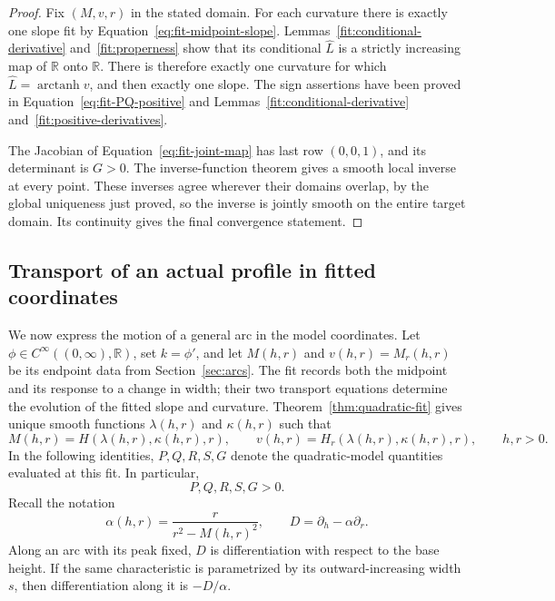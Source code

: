 \begin{proof}
Fix \((M,v,r)\) in the stated domain.  For each curvature there is
exactly one slope fit by Equation~\eqref{eq:fit-midpoint-slope}.
Lemmas~\ref{fit:conditional-derivative} and~\ref{fit:properness}
show that its conditional \(\widehat L\) is a strictly increasing
map of \(\mathbb R\) onto \(\mathbb R\).  There is therefore exactly
one curvature for which \(\widehat L=\operatorname{arctanh}v\),
and then exactly one slope.  The sign assertions have been proved
in Equation~\eqref{eq:fit-PQ-positive} and
Lemmas~\ref{fit:conditional-derivative} and~\ref{fit:positive-derivatives}.

The Jacobian of Equation~\eqref{eq:fit-joint-map} has last row
\((0,0,1)\), and its determinant is \(G>0\).  The inverse-function
theorem gives a smooth local inverse at every point.  These inverses
agree wherever their domains overlap, by the global uniqueness
just proved, so the inverse is jointly smooth on the entire target
domain.  Its continuity gives the final convergence statement.
\end{proof}

\subsection{Transport of an actual profile in fitted coordinates}

We now express the motion of a general arc in the model coordinates.
Let $\phi\in C^\infty((0,\infty),\mathbb R)$, set $k=\phi'$,
and let $M(h,r)$ and $v(h,r)=M_r(h,r)$ be its endpoint data from
Section~\ref{sec:arcs}. The fit records both the midpoint and its
response to a change in width; their two transport equations determine
the evolution of the fitted slope and curvature.
Theorem~\ref{thm:quadratic-fit} gives unique smooth functions $\lambda(h,r)$ and $\kappa(h,r)$ such that
\begin{equation}\label{eq:fit-identities}
 M(h,r)=H(\lambda(h,r),\kappa(h,r),r),\qquad
 v(h,r)=H_r(\lambda(h,r),\kappa(h,r),r),
 \qquad h,r>0.
\end{equation}
In the following identities, $P,Q,R,S,G$ denote the quadratic-model
quantities evaluated at this fit.  In particular,
\[
 P,Q,R,S,G>0.
\]
Recall the notation
\[
 \alpha(h,r)=\frac{r}{r^2-M(h,r)^2},\qquad
 D=\partial_h-\alpha\partial_r.
\]
Along an arc with its peak fixed, $D$ is differentiation with respect
to the base height.  If the same characteristic is parametrized by its
outward-increasing width $s$, then differentiation along it is
$-D/\alpha$.

